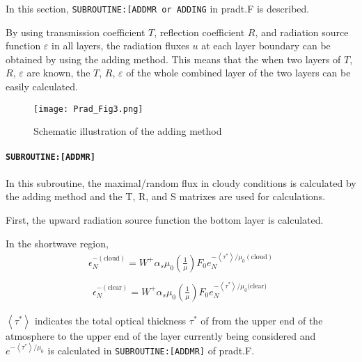 In this section, \texttt{SUBROUTINE:{[}ADDMR\ or\ ADDING} in pradt.F is
described.

By using transmission coefficient \(T\), reflection coefficient \(R\),
and radiation source function \(\varepsilon\) in all layers, the
radiation fluxes \(u\) at each layer boundary can be obtained by using
the adding method. This means that the when two layers of \(T\), \(R\),
\(\varepsilon\) are known, the \(T\), \(R\), \(\varepsilon\) of the
whole combined layer of the two layers can be easily calculated.

\begin{figure}
\centering
\texttt{[image: Prad\_Fig3.png]}
\caption{Schematic illustration of the adding method}
\end{figure}

\hypertarget{subroutineaddmr}{%
\paragraph{\texorpdfstring{\texttt{SUBROUTINE:{[}ADDMR{]}}}{SUBROUTINE:{[}ADDMR{]}}}\label{subroutineaddmr}}

In this subroutine, the maximal/random flux in cloudy conditions is
calculated by the adding method and the T, R, and S matrixes are used
for calculations.

First, the upward radiation source function the bottom layer is
calculated.

In the shortwave region, \begin{equation}
\begin{array}{l}
\epsilon_{N}^{-(\text {cloud})}=W^{+} \alpha_{s} \mu_{0}\left(\frac{1}{\mu}\right) F_{0} e_{N}^{-\left\langle\tau^{*}\right\rangle / \mu_{0}(\text{cloud})} \\
\end{array}
\end{equation} \begin{equation}
\begin{array}{l}
\epsilon_{N}^{-(\text {clear})}=W^{+} \alpha_{s} \mu_{0}\left(\frac{1}{\mu}\right) F_{0} e_{N}^{-\left\langle\tau^{*}\right\rangle / \mu_{0} \text {(clear) }}
\end{array}
\end{equation}

\(\left\langle\tau^{*}\right\rangle\) indicates the total optical
thickness \(\tau^{*}\) of from the upper end of the atmosphere to the
upper end of the layer currently being considered and
\(e^{-\left\langle\tau^{*}\right\rangle / \mu_{0}}\) is calculated in
\texttt{SUBROUTINE:{[}ADDMR{]}} of pradt.F.

